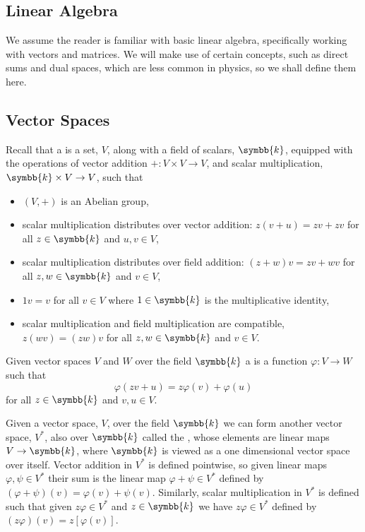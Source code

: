 \documentclass[fleqn]{NotesClass}
\renewcommand{\field}{\symbb{k}}
\newcommand{\dual}[1]{{#1^{*}}}
\begin{document}
    
    \printbibliography
    \appendixpage
    \begin{appendices}
        \chapter{Linear Algebra}\label{sec:linear algebra}
        We assume the reader is familiar with basic linear algebra, specifically working with vectors and matrices.
        We will make use of certain concepts, such as direct sums and dual spaces, which are less common in physics, so we shall define them here.
        
        \section{Vector Spaces}\label{sec:vector spaces}
        Recall that a  is a set, \(V\), along with a field of scalars, \(\field\), equipped with the operations of vector addition \(+ \colon V \times V \to V\), and scalar multiplication, \(\field \times V \to V\), such that
        \begin{itemize}
            \item \((V, +)\) is an Abelian group,
            \item scalar multiplication distributes over vector addition: \(z(v + u) = zv + zv\) for all \(z \in \field\) and \(u, v \in V\),
            \item scalar multiplication distributes over field addition: \((z + w)v = zv + wv\) for all \(z, w \in \field\) and \(v \in V\),
            \item \(1v = v\) for all \(v \in V\) where \(1 \in \field\) is the multiplicative identity,
            \item scalar multiplication and field multiplication are compatible, \(z(wv) = (zw)v\) for all \(z, w \in \field\) and \(v \in V\).
        \end{itemize}
        
        Given vector spaces \(V\) and \(W\) over the field \(\field\) a  is a function \(\varphi \colon V \to W\) such that
        \begin{equation}
            \varphi(zv + u) = z\varphi(v) + \varphi(u)
        \end{equation}
        for all \(z\in \field\) and \(v, u \in V\).
        
        Given a vector space, \(V\), over the field \(\field\) we can form another vector space, \(\dual{V}\), also over \(\field\) called the , whose elements are linear maps \(V \to \field\), where \(\field\) is viewed as a one dimensional vector space over itself.
        Vector addition in \(\dual{V}\) is defined pointwise, so given linear maps \(\varphi, \psi \in \dual{V}\) their sum is the linear map \(\varphi + \psi \in \dual{V}\) defined by \((\varphi + \psi)(v) = \varphi(v) + \psi(v)\).
        Similarly, scalar multiplication in \(\dual{V}\) is defined such that given \(z \varphi \in \dual{V}\) and \(z \in \field\) we have \(z\varphi \in \dual{V}\) defined by \((z\varphi)(v) = z[\varphi(v)]\).
        

\end{appendices}
\end{document}
